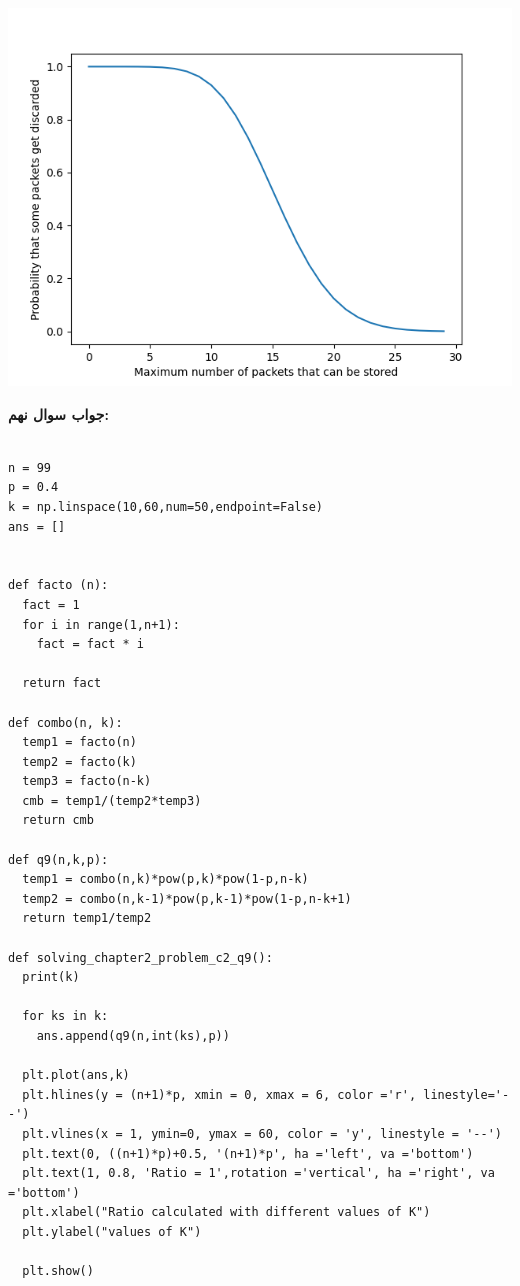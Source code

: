 \documentclass[a4paper,14pt]{article}
\begin{document}
\begin{center}
	\includegraphics[width=1\textwidth]{pic3.png}
\end{center}

\textbf{جواب سوال نهم:}

\fontsize{11}{11}\selectfont

\begin{latin}
	\begin{lstlisting}

n = 99
p = 0.4
k = np.linspace(10,60,num=50,endpoint=False)
ans = []


def facto (n):
  fact = 1
  for i in range(1,n+1):
    fact = fact * i

  return fact

def combo(n, k):
  temp1 = facto(n)
  temp2 = facto(k)
  temp3 = facto(n-k)
  cmb = temp1/(temp2*temp3)
  return cmb

def q9(n,k,p):
  temp1 = combo(n,k)*pow(p,k)*pow(1-p,n-k)
  temp2 = combo(n,k-1)*pow(p,k-1)*pow(1-p,n-k+1)
  return temp1/temp2

def solving_chapter2_problem_c2_q9():
  print(k)

  for ks in k:
    ans.append(q9(n,int(ks),p))

  plt.plot(ans,k)
  plt.hlines(y = (n+1)*p, xmin = 0, xmax = 6, color ='r', linestyle='--')
  plt.vlines(x = 1, ymin=0, ymax = 60, color = 'y', linestyle = '--')
  plt.text(0, ((n+1)*p)+0.5, '(n+1)*p', ha ='left', va ='bottom')
  plt.text(1, 0.8, 'Ratio = 1',rotation ='vertical', ha ='right', va ='bottom')
  plt.xlabel("Ratio calculated with different values of K")
  plt.ylabel("values of K")

  plt.show()

	\end{lstlisting}
\end{latin}
	\fontsize{14}{14}\selectfont
	
\end{document}
